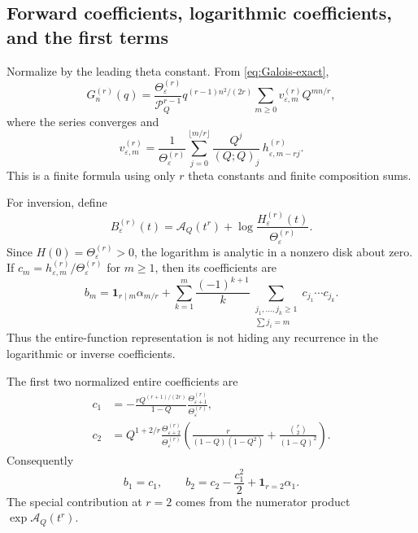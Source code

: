 \documentclass[11pt]{article}
\numberwithin{equation}{section}
\theoremstyle{definition}
\newcommand{\pp}[1]{(Q;Q)_{#1}}
\newcommand{\Pinf}{\mathcal P_Q}
\newcommand{\A}{\mathcal A_Q}
\newcommand{\eps}{\varepsilon}
\newcommand{\T}{\Theta}
\newcommand{\one}{\mathbf 1}
\begin{document}
\subsection{Forward coefficients, logarithmic coefficients, and the first terms}

Normalize by the leading theta constant. From \eqref{eq:Galois-exact},
\begin{equation}\label{eq:Galois-forward-normalized}
 G_n^{(r)}(q)=\frac{\T_{\eps}^{(r)}}{\Pinf^{r-1}}
 q^{(r-1)n^2/(2r)}\sum_{m\ge0}v_{\eps,m}^{(r)}Q^{mn/r},
\end{equation}
where the series converges and
\begin{equation}\label{eq:Galois-v}
 v_{\eps,m}^{(r)}=
 \frac1{\T_{\eps}^{(r)}}
 \sum_{j=0}^{\lfloor m/r\rfloor}
 \frac{Q^j}{\pp{j}}\,h_{\eps,m-rj}^{(r)}.
\end{equation}
This is a finite formula using only $r$ theta constants and finite composition sums.

For inversion, define
\begin{equation}\label{eq:Galois-B}
 B_{\eps}^{(r)}(t)=\A(t^r)+
       \log\frac{H_{\eps}^{(r)}(t)}{\T_{\eps}^{(r)}}.
\end{equation}
Since $H(0)=\T_{\eps}^{(r)}>0$, the logarithm is analytic in a nonzero disk about zero. If
$c_m=h_{\eps,m}^{(r)}/\T_{\eps}^{(r)}$ for $m\ge1$, then its coefficients are
\begin{equation}\label{eq:Galois-b}
 b_m=\one_{r\mid m}\alpha_{m/r}
 +\sum_{k=1}^m\frac{(-1)^{k+1}}k
  \sum_{\substack{j_1,\ldots,j_k\ge1\\\sum j_i=m}}
       c_{j_1}\cdots c_{j_k}.
\end{equation}
Thus the entire-function representation is not hiding any recurrence in the logarithmic or inverse coefficients.

The first two normalized entire coefficients are
\begin{align}
 c_1&=-\frac{rQ^{(r+1)/(2r)}}{1-Q}
               \frac{\T_{\eps+1}^{(r)}}{\T_{\eps}^{(r)}},
 \label{eq:Galois-c1}\\
 c_2&=Q^{1+2/r}\frac{\T_{\eps+2}^{(r)}}{\T_{\eps}^{(r)}}
 \left(\frac r{(1-Q)(1-Q^2)}
       +\frac{\binom r2}{(1-Q)^2}\right).
 \label{eq:Galois-c2}
\end{align}
Consequently
\begin{equation}\label{eq:Galois-b12}
 b_1=c_1,\qquad b_2=c_2-\frac{c_1^2}2+\one_{r=2}\alpha_1.
\end{equation}
The special contribution at $r=2$ comes from the numerator product $\exp\A(t^r)$.
\end{document}
